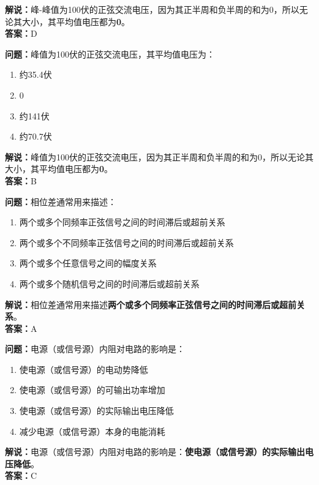\documentclass{ctexbook}
\begin{document}
\noindent\textbf{解说：}峰-峰值为100伏的正弦交流电压，因为其正半周和负半周的和为0，所以无论其大小，其平均值电压都为\textbf{0}。\\\noindent\textbf{答案：}D


\bigskip


\noindent\textbf{问题：}峰值为100伏的正弦交流电压，其平均值电压为：

\begin{enumerate}[label=\Alph*), leftmargin=3em]
	\item 约35.4伏
	\item 0
	\item 约141伏
	\item 约70.7伏
\end{enumerate}

\noindent\textbf{解说：}峰值为100伏的正弦交流电压，因为其正半周和负半周的和为0，所以无论其大小，其平均值电压都为\textbf{0}。\\\noindent\textbf{答案：}B


\bigskip


\noindent\textbf{问题：}相位差通常用来描述：

\begin{enumerate}[label=\Alph*), leftmargin=3em]
	\item 两个或多个同频率正弦信号之间的时间滞后或超前关系
	\item 两个或多个不同频率正弦信号之间的时间滞后或超前关系
	\item 两个或多个任意信号之间的幅度关系
	\item 两个或多个随机信号之间的时间滞后或超前关系
\end{enumerate}

\noindent\textbf{解说：}相位差通常用来描述\textbf{两个或多个同频率正弦信号之间的时间滞后或超前关系}。\\\noindent\textbf{答案：}A


\bigskip


\noindent\textbf{问题：}电源（或信号源）内阻对电路的影响是：

\begin{enumerate}[label=\Alph*), leftmargin=3em]
	\item 使电源（或信号源）的电动势降低
	\item 使电源（或信号源）的可输出功率增加
	\item 使电源（或信号源）的实际输出电压降低
	\item 减少电源（或信号源）本身的电能消耗
\end{enumerate}

\noindent\textbf{解说：}电源（或信号源）内阻对电路的影响是：\textbf{使电源（或信号源）的实际输出电压降低}。\\\noindent\textbf{答案：}C
\end{document}
